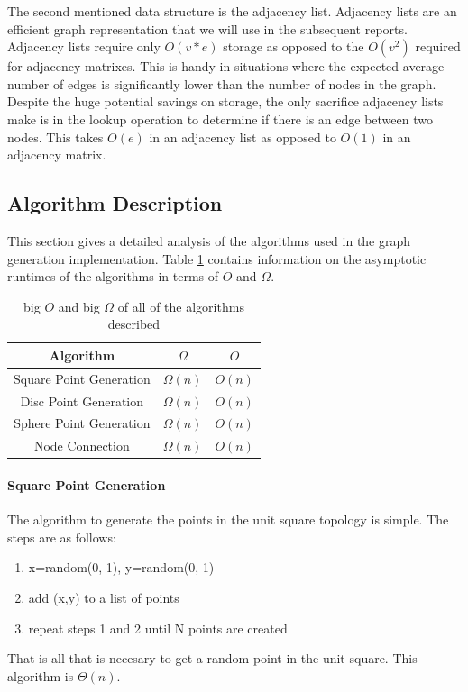 \documentclass{article}
\begin{document}
		The second mentioned data structure is the adjacency list.
		Adjacency lists are an efficient graph representation that we will use in the subsequent reports.
		Adjacency lists require only $O(v*e)$ storage as opposed to the $O(v^2)$ required for adjacency matrixes.
		This is handy in situations where the expected average number of edges is significantly lower than the number of nodes in the graph.
		Despite the huge potential savings on storage, the only sacrifice adjacency lists make is in the lookup operation to determine if there is an edge between two nodes.
		This takes $O(e)$ in an adjacency list as opposed to $O(1)$ in an adjacency matrix.

	\subsection{Algorithm Description}
		This section gives a detailed analysis of the algorithms used in the graph generation implementation.
    Table \ref{asymptotic_runtime_table} contains information on the asymptotic runtimes of the algorithms in terms of $O$ and $\Omega$.
    	\begin{center}
    		\begin{table}
          \label{asymptotic_runtime_table}
    			\begin{tabular}{ |c|c|c| }
    				\hline
    				Algorithm & $\Omega$ & $O$ \\
    				\hline
    				Square Point Generation & $\Omega(n)$ & $O(n)$ \\
    				\hline
    				Disc Point Generation & $\Omega(n)$ & $O(n)$ \\
    				\hline
            Sphere Point Generation & $\Omega(n)$ & $O(n)$ \\
            \hline
    				Node Connection & $\Omega(n)$ & $O(n)$ \\
    				\hline
    			\end{tabular}
          \caption{big $O$ and big $\Omega$ of all of the algorithms described}
    		\end{table}
    	\end{center}

  \paragraph{Square Point Generation}
		The algorithm to generate the points in the unit square topology is simple.
		The steps are as follows:
    \begin{enumerate}
      \item x=random(0, 1), y=random(0, 1)
      \item add (x,y) to a list of points
      \item repeat steps 1 and 2 until N points are created
    \end{enumerate}
    That is all that is necesary to get a random point in the unit square.
    This algorithm is $\Theta(n)$.
\end{document}
